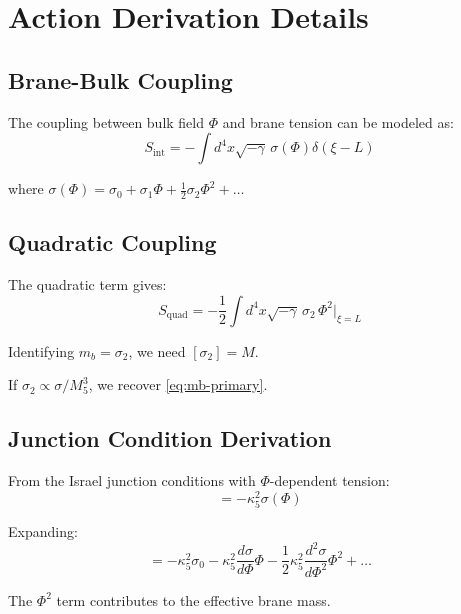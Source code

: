\documentclass[11pt,a4paper]{article}
\newcommand{\Mfive}{M_5}
\newcommand{\mb}{m_b}
\theoremstyle{definition}
\theoremstyle{plain}
\theoremstyle{remark}
\begin{document}
\section{Action Derivation Details}
\label{app:action}

\subsection{Brane-Bulk Coupling}

The coupling between bulk field $\Phi$ and brane tension can be modeled as:
\begin{equation}
S_{\mathrm{int}} = -\int d^4x \sqrt{-\gamma} \, \sigma(\Phi) \delta(\xi - L)
\label{eq:app-interaction}
\end{equation}

where $\sigma(\Phi) = \sigma_0 + \sigma_1 \Phi + \frac{1}{2}\sigma_2\Phi^2 + \ldots$

\subsection{Quadratic Coupling}

The quadratic term gives:
\begin{equation}
S_{\mathrm{quad}} = -\frac{1}{2}\int d^4x \sqrt{-\gamma} \, \sigma_2 \, \Phi^2\big|_{\xi=L}
\label{eq:app-quad}
\end{equation}

Identifying $\mb = \sigma_2$, we need $[\sigma_2] = M$.

If $\sigma_2 \propto \sigma/\Mfive^3$, we recover \cref{eq:mb-primary}.

\subsection{Junction Condition Derivation}

From the Israel junction conditions with $\Phi$-dependent tension:
\begin{equation}
[K] = -\kappa_5^2 \sigma(\Phi)
\label{eq:app-junction}
\end{equation}

Expanding:
\begin{equation}
[K] = -\kappa_5^2 \sigma_0 - \kappa_5^2 \frac{d\sigma}{d\Phi}\Phi - \frac{1}{2}\kappa_5^2 \frac{d^2\sigma}{d\Phi^2}\Phi^2 + \ldots
\label{eq:app-junction-expanded}
\end{equation}

The $\Phi^2$ term contributes to the effective brane mass.
\end{document}
